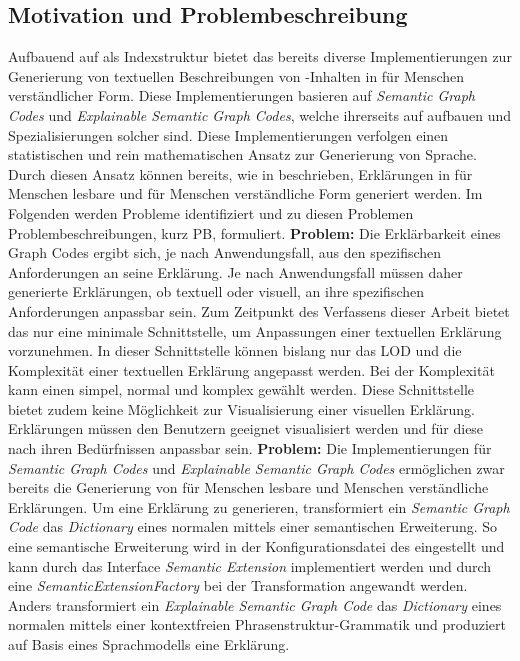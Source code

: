 \subsection{Motivation und Problembeschreibung}
\label{sec1:intro:subsec:motiv-problems}
Aufbauend auf \gcs{} als Indexstruktur bietet das \gmaf{} bereits diverse Implementierungen zur Generierung von textuellen Beschreibungen von \mmir{}-Inhalten in für Menschen verständlicher Form.
Diese Implementierungen basieren auf \textit{Semantic Graph Codes} und \textit{Explainable Semantic Graph Codes}, welche ihrerseits auf \gcs{} aufbauen und Spezialisierungen solcher sind. 
Diese Implementierungen verfolgen einen statistischen und rein mathematischen Ansatz zur Generierung von Sprache. 
Durch diesen Ansatz können bereits, wie in \cite{towards_auto_sem_expl_mmfg} beschrieben, Erklärungen in für Menschen lesbare und für Menschen verständliche Form generiert werden. 
\med
Im Folgenden werden Probleme identifiziert und zu diesen Problemen Problembeschreibungen, kurz PB,
formuliert.
\med
\textbf{Problem:}
Die Erklärbarkeit eines Graph Codes ergibt sich, je nach Anwendungsfall, aus den spezifischen Anforderungen an seine Erklärung. Je nach Anwendungsfall müssen daher generierte Erklärungen, ob textuell oder visuell, an ihre spezifischen Anforderungen anpassbar sein. 
Zum Zeitpunkt des Verfassens dieser Arbeit bietet das \gmaf{} nur eine minimale Schnittstelle, um Anpassungen einer textuellen Erklärung vorzunehmen. 
In dieser Schnittstelle können bislang nur das LOD und die Komplexität einer textuellen Erklärung angepasst werden. 
Bei der Komplexität kann einen simpel, normal und komplex gewählt werden.  
Diese Schnittstelle bietet zudem keine Möglichkeit zur Visualisierung einer visuellen Erklärung.
\med
\problemstmt{} 
Erklärungen müssen den Benutzern geeignet visualisiert werden und für diese nach ihren Bedürfnissen anpassbar sein.
\med
\textbf{Problem:} 
Die Implementierungen für \textit{Semantic Graph Codes} und \textit{Explainable Semantic Graph Codes} ermöglichen zwar bereits die Generierung von für Menschen lesbare und Menschen verständliche Erklärungen. 
Um eine Erklärung zu generieren, transformiert ein \textit{Semantic Graph Code} das \textit{Dictionary} eines normalen \gcs{} mittels einer semantischen Erweiterung. 
So eine semantische Erweiterung wird in der Konfigurationsdatei des \gmaf{} eingestellt und kann durch das Interface \textit{Semantic Extension} implementiert werden und durch eine \textit{SemanticExtensionFactory} bei der Transformation angewandt werden. 
Anders transformiert ein \textit{Explainable Semantic Graph Code} das \textit{Dictionary} eines normalen \gcs{} mittels einer kontextfreien Phrasenstruktur-Grammatik und produziert auf Basis eines Sprachmodells eine Erklärung.
